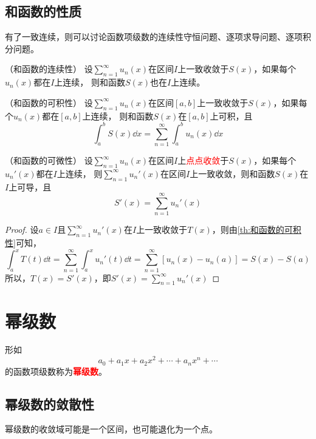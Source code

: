 \subsection{和函数的性质}
有了一致连续，则可以讨论函数项级数的连续性守恒问题、逐项求导问题、逐项积分问题。
\begin{theorem}
    （和函数的连续性）
    \label{th:和函数的连续性}
    设$\displaystyle\sum_{n=1}^\infty u_n(x)$在区间$I$上一致收敛于$S(x)$，如果每个$u_n(x)$都在$I$上连续，
    则和函数$S(x)$也在$I$上连续。
\end{theorem}
\begin{theorem}
    （和函数的可积性）
    \label{th:和函数的可积性}
    设$\displaystyle\sum_{n=1}^\infty u_n(x)$在区间$[a,b]$上一致收敛于$S(x)$，如果每个$u_n(x)$都在$[a,b]$上连续，
    则和函数$S(x)$在$[a,b]$上可积，且
    \[ \int_a^b S(x)\dd{x} = \sum_{n=1}^\infty \int_a^b u_n(x)\dd{x} \]
\end{theorem}
\begin{theorem}
    （和函数的可微性）
    \label{th:和函数的可微性}
    设$\displaystyle\sum_{n=1}^\infty u_n(x)$在区间$I$上\textcolor{red}{点点收敛}于$S(x)$，如果每个$u_n'(x)$都在$I$上连续，
    则$\displaystyle\sum_{n=1}^\infty u_n'(x)$在区间$I$上一致收敛，则和函数$S(x)$在$I$上可导，且
    \[ S'(x) = \sum_{n=1}^\infty u_n'(x) \]
\end{theorem}
\begin{proof}
    设$a\in I$且$\displaystyle\sum_{n=1}^\infty u_n'(x)$在$I$上一致收敛于$T(x)$，则由\ref{th:和函数的可积性}可知，
    \[
        \int_a^x T(t)\dd{t}
        =
        \sum_{n=1}^\infty \int_a^x u_n'(t)\dd{t}
        =
        \sum_{n=1}^\infty [u_n(x)-u_n(a)]
        =
        S(x) - S(a)
    \]
    所以，$T(x)=S'(x)$，即$\displaystyle S'(x)=\sum_{n=1}^\infty u_n'(x)$
\end{proof}

\section{幂级数}
形如
\[ a_0 + a_1x + a_2x^2 + \cdots + a_nx^n +\cdots \]
的函数项级数称为\textcolor{red}{\textbf{\textsf{幂级数}}}。

\subsection{幂级数的敛散性}
幂级数的收敛域可能是一个区间，也可能退化为一个点。


